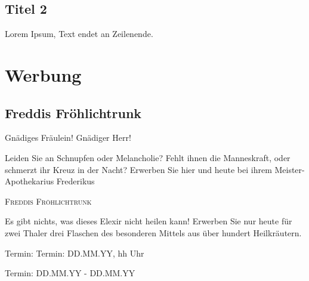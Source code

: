 \documentclass[final]{multiversum}
\begin{document}
\subsection{Titel 2}
Lorem Ipsum, Text endet an Zeilenende.

\section{Werbung}
\subsection{Freddis Fröhlichtrunk}
Gnädiges Fräulein! Gnädiger Herr!  

Leiden Sie an Schnupfen oder Melancholie? Fehlt ihnen die Manneskraft, oder schmerzt ihr Kreuz in der Nacht? Erwerben Sie hier und heute bei ihrem Meister-Apothekarius Frederikus

\begin{center}\textsc{Freddis Fröhlichtrunk}\end{center}

Es gibt nichts, was dieses Elexir nicht heilen kann! Erwerben Sie nur heute für zwei Thaler drei Flaschen des besonderen Mittels aus über hundert Heilkräutern. 


\begin{termine}
\item Termin: Termin: DD.MM.YY, hh Uhr
  \item Termin: DD.MM.YY - DD.MM.YY
\end{termine}
\impressum
\end{document}
